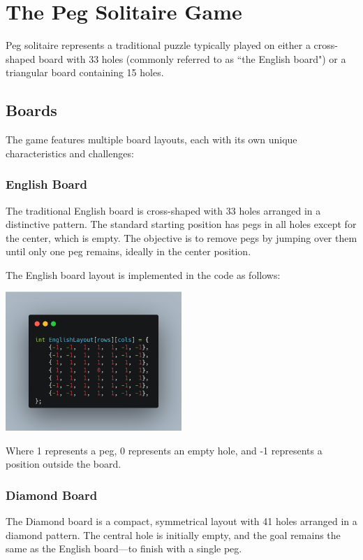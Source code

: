 \section{The Peg Solitaire Game}
\label{sec:peg-solitaire-game}

Peg solitaire represents a traditional puzzle typically played on either a cross-shaped board with 33 holes (commonly referred to as ``the English board") or a triangular board containing 15 holes.\cite{Bell_2006}

\subsection{Boards}
The game features multiple board layouts, each with its own unique characteristics and challenges:

\subsubsection{English Board}
The traditional English board is cross-shaped with 33 holes arranged in a distinctive pattern. The standard starting position has pegs in all holes except for the center, which is empty. The objective is to remove pegs by jumping over them until only one peg remains, ideally in the center position.

The English board layout is implemented in the code as follows:

\begin{center}
\includegraphics[width=0.5\textwidth]{resource/code-examples/EnglishLayout.png}
\end{center}

Where 1 represents a peg, 0 represents an empty hole, and -1 represents a position outside the board.

\subsubsection{Diamond Board}
The Diamond board is a compact, symmetrical layout with 41 holes arranged in a diamond pattern. The central hole is initially empty, and the goal remains the same as the English board—to finish with a single peg.

